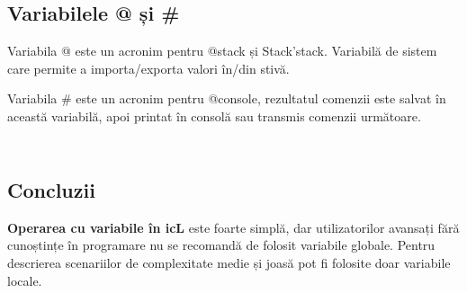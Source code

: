 \subsection{Variabilele @ și \#}

{Variabila @} este un acronim pentru @stack și Stack'stack. Variabilă de sistem care permite a importa/exporta valori în/din stivă. 

{Variabila \#} este un acronim pentru @console, rezultatul comenzii este salvat în această variabilă, apoi printat în consolă sau transmis comenzii următoare.


\begin{sourcecode}
    \label{globalvars}
    \inputminted[linenos]{icl}{../sources/globalvars.icL}
\end{sourcecode}

\begin{sourcecode}
    \label{rlvalues}
    \inputminted[linenos]{icl}{../sources/rlvalues.icL}
\end{sourcecode}

\subsection{Concluzii}

{\bf Operarea cu variabile în icL} este foarte simplă, dar utilizatorilor avansați fără cunoștințe în programare nu se recomandă de folosit variabile globale. Pentru descrierea scenariilor de complexitate medie și joasă pot fi folosite doar variabile locale.
